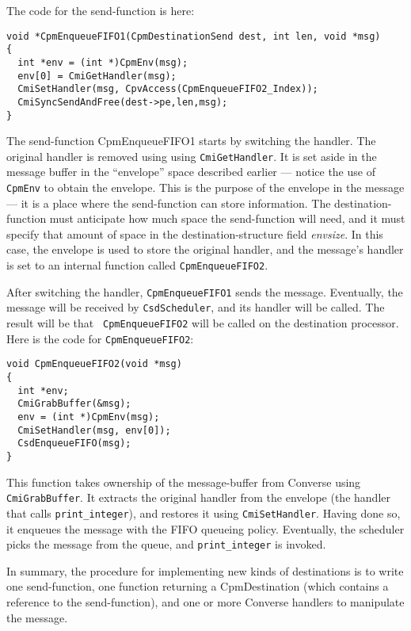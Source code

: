 The code for the send-function is here:

\begin{verbatim}
void *CpmEnqueueFIFO1(CpmDestinationSend dest, int len, void *msg)
{
  int *env = (int *)CpmEnv(msg);
  env[0] = CmiGetHandler(msg);
  CmiSetHandler(msg, CpvAccess(CpmEnqueueFIFO2_Index));
  CmiSyncSendAndFree(dest->pe,len,msg);
}
\end{verbatim}

The send-function CpmEnqueueFIFO1 starts by switching the handler.
The original handler is removed using using {\tt CmiGetHandler}.  It
is set aside in the message buffer in the ``envelope'' space described
earlier --- notice the use of {\tt CpmEnv} to obtain the envelope.
This is the purpose of the envelope in the message --- it is a place
where the send-function can store information.  The
destination-function must anticipate how much space the send-function
will need, and it must specify that amount of space in the
destination-structure field {\it envsize}.  In this case, the envelope
is used to store the original handler, and the message's handler is
set to an internal function called {\tt CpmEnqueueFIFO2}.

After switching the handler, {\tt CpmEnqueueFIFO1} sends the message.
Eventually, the message will be received by {\tt CsdScheduler}, and
its handler will be called.  The result will be that {\tt
CpmEnqueueFIFO2} will be called on the destination processor.  Here is
the code for {\tt CpmEnqueueFIFO2}:

\begin{verbatim}
void CpmEnqueueFIFO2(void *msg)
{
  int *env;
  CmiGrabBuffer(&msg);
  env = (int *)CpmEnv(msg);
  CmiSetHandler(msg, env[0]);
  CsdEnqueueFIFO(msg);
}
\end{verbatim}

This function takes ownership of the message-buffer from Converse
using {\tt CmiGrabBuffer}.  It extracts the original handler from the
envelope (the handler that calls {\tt print\_integer}), and restores it
using {\tt CmiSetHandler}.  Having done so, it enqueues the message
with the FIFO queueing policy.  Eventually, the scheduler picks the
message from the queue, and {\tt print\_integer} is invoked.

In summary, the procedure for implementing new kinds of destinations
is to write one send-function, one function returning a CpmDestination
(which contains a reference to the send-function), and one or more
Converse handlers to manipulate the message.

